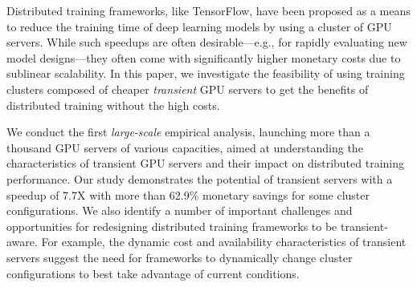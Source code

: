 Distributed training frameworks, like TensorFlow, have been proposed as a means
to reduce the training time of deep learning models by using a cluster of GPU
servers. While such speedups are  often desirable---e.g., for rapidly
evaluating new model designs---they often come with significantly higher
monetary costs due to sublinear scalability. In this paper, we investigate the
feasibility of using training clusters  composed of cheaper  \emph{transient}
GPU servers to get the benefits of distributed training without the high costs.

We conduct the first \emph{large-scale} empirical analysis, launching more than
a thousand GPU servers of various capacities, aimed at understanding the
characteristics of transient GPU servers and their impact on distributed
training performance. Our study demonstrates the potential of  transient
servers with a speedup of 7.7X with more than 62.9\% monetary savings for some
cluster configurations. We also identify a number of important challenges and
opportunities for redesigning distributed training frameworks to be
transient-aware. For example, the dynamic cost and availability characteristics
of transient servers suggest the need for frameworks to dynamically change
cluster configurations to best take advantage of current conditions. 
 
